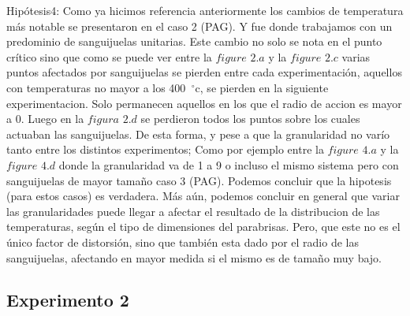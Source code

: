 Hipótesis4: Como ya hicimos referencia anteriormente los cambios de temperatura más notable se presentaron en el caso 2 (PAG). Y fue donde trabajamos con un predominio de sanguijuelas unitarias. Este cambio no solo se nota en el punto crítico sino que como se puede ver entre la $figure$ $2.a$ y la $figure$ $2.c$ varias puntos afectados por sanguijuelas se pierden entre cada experimentación, aquellos con temperaturas no mayor a los 400\hspace{-1.5mm}$\phantom{a}^{\circ}$c, se pierden en la siguiente experimentacion. Solo permanecen aquellos en los que el radio de accion es mayor a 0. Luego en la $figura$ $2.d$ se perdieron todos los puntos sobre los cuales actuaban las sanguijuelas. De esta forma, y pese a que la granularidad no varío tanto entre los distintos experimentos; Como por ejemplo entre la $figure$ $4.a$ y la $figure$ $4.d$ donde la granularidad va de 1 a 9 o  incluso el mismo sistema pero  con sanguijuelas de mayor tamaño caso 3 (PAG). Podemos concluir que la hipotesis (para estos casos) es verdadera. Más aún, podemos concluir en general que variar las granularidades puede llegar a afectar el resultado de la distribucion de las temperaturas, según el tipo de dimensiones del parabrisas. Pero, que este no es el único factor de distorsión, sino que también esta dado por el radio de las sanguijuelas, afectando en mayor medida si el mismo es de tamaño muy bajo.  


\subsection{Experimento 2}
